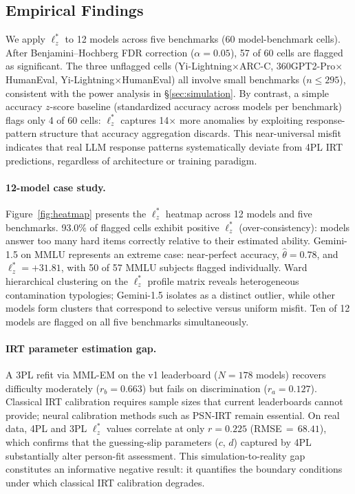 \subsection{Empirical Findings}
\label{sec:empirical}

We apply $\ell_z^*$ to 12 models across five benchmarks (60 model-benchmark cells).
After Benjamini--Hochberg FDR correction ($\alpha=0.05$), 57 of 60 cells are flagged as significant.
The three unflagged cells (Yi-Lightning$\times$ARC-C, 360GPT2-Pro$\times$HumanEval, Yi-Lightning$\times$HumanEval) all involve small benchmarks ($n \leq 295$), consistent with the power analysis in \S\ref{sec:simulation}.
By contrast, a simple accuracy $z$-score baseline (standardized accuracy across models per benchmark) flags only 4 of 60 cells: $\ell_z^*$ captures 14$\times$ more anomalies by exploiting response-pattern structure that accuracy aggregation discards.
This near-universal misfit indicates that real LLM response patterns systematically deviate from 4PL IRT predictions, regardless of architecture or training paradigm.

\paragraph{12-model case study.}
Figure~\ref{fig:heatmap} presents the $\ell_z^*$ heatmap across 12 models and five benchmarks.
93.0\% of flagged cells exhibit positive $\ell_z^*$ (over-consistency): models answer too many hard items correctly relative to their estimated ability.
Gemini-1.5 on MMLU represents an extreme case: near-perfect accuracy, $\hat{\theta}=0.78$, and $\ell_z^*{=}{+}31.81$, with 50 of 57 MMLU subjects flagged individually.
Ward hierarchical clustering on the $\ell_z^*$ profile matrix reveals heterogeneous contamination typologies; Gemini-1.5 isolates as a distinct outlier, while other models form clusters that correspond to selective versus uniform misfit.
Ten of 12 models are flagged on all five benchmarks simultaneously.

\paragraph{IRT parameter estimation gap.}
A 3PL refit via MML-EM on the v1 leaderboard ($N{=}178$ models) recovers difficulty moderately ($r_b = 0.663$) but fails on discrimination ($r_a = 0.127$).
Classical IRT calibration requires sample sizes that current leaderboards cannot provide; neural calibration methods such as PSN-IRT \citep{psnirt2026} remain essential.
On real data, 4PL and 3PL $\ell_z^*$ values correlate at only $r=0.225$ (RMSE$\,{=}\,68.41$), which confirms that the guessing-slip parameters ($c$, $d$) captured by 4PL substantially alter person-fit assessment.
This simulation-to-reality gap constitutes an informative negative result: it quantifies the boundary conditions under which classical IRT calibration degrades.

